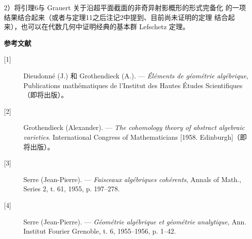 2）将引理6与 Grauert 关于沿超平面截面的非奇异射影概形的形式完备化
的一项结果结合起来（或者与定理11之后注记2中提到、目前尚未证明的定理
结合起来），也可以在代数几何中证明经典的基本群 Lefschetz
定理。

\begin{center}
  \textbf{参考文献}
\end{center}

\begin{description}
  \item[{[1]}] Dieudonné (J.) 和 Grothendieck (A.). --- \emph{Éléments de
    géométrie algébrique}, Publications mathématiques de l'Institut des Hautes
    Études Scientifiques（即将出版）。
  \item[{[2]}] Grothendieck (Alexander). --- \emph{The cohomology theory of
    abstract algebraic varieties}. International Congress of Mathematicians
    [1958. Edinburgh]（即将出版）。
  \item[{[3]}] Serre (Jean-Pierre). --- \emph{Faisceaux algébriques
    cohérents}, Annals of Math., Series 2, t. 61, 1955, p. 197--278.
  \item[{[4]}] Serre (Jean-Pierre). --- \emph{Géométrie algébrique et
    géométrie analytique}, Ann. Institut Fourier Grenoble, t. 6, 1955--1956,
    p. 1--42.
\end{description}

\par
